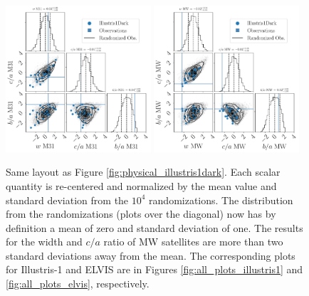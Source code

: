 \documentclass[a4paper,fleqn,usenatbib]{mnras}
\begin{document}
\begin{figure}
\centering
\includegraphics[width=0.48\textwidth]{input_illustris1dark_obs_M31_n_11_normed.pdf}
\includegraphics[width=0.48\textwidth]{input_illustris1dark_obs_MW_n_11_normed.pdf}
\caption{
Same layout as Figure \ref{fig:physical_illustris1dark}. 
  Each scalar
  quantity is re-centered and normalized by the mean value and standard
  deviation from the $10^4$ randomizations. 
  The distribution from the randomizations (plots over the diagonal)
  now has by definition a mean of zero and standard deviation of one. 
The results for the width and $c/a$ ratio of MW satellites are more
than two standard deviations away from the mean. 
The corresponding plots for Illustris-1 and ELVIS are
in Figures \ref{fig:all_plots_illustris1} and
\ref{fig:all_plots_elvis},
respectively. \label{fig:normalized_illustris1dark}}     
\end{figure}
\end{document}

